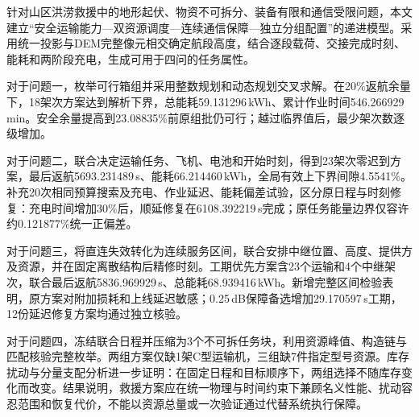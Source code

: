 针对山区洪涝救援中的地形起伏、物资不可拆分、装备有限和通信受限问题，本文建立“安全运输能力—双资源调度—连续通信保障—独立分组配置”的递进模型。采用统一投影与DEM完整像元相交确定航段高度，结合逐段载荷、交接完成时刻、能耗和两阶段充电，生成可用于四问的任务属性。

对于问题一，枚举可行箱组并采用整数规划和动态规划交叉求解。在20\%返航余量下，18架次方案达到解析下界，总能耗59.131296\,kWh、累计作业时间546.266929\,min。安全余量提高到23.08835\%前原组批仍可行；越过临界值后，最少架次数逐级增加。

对于问题二，联合决定运输任务、飞机、电池和开始时刻，得到23架次零迟到方案，最后返航5693.231489\,s、能耗66.214460\,kWh，全局有效上下界间隙4.5541\%。补充20次相同预算搜索及充电、作业延迟、能耗偏差试验，区分原日程与时刻修复：充电时间增加30\%后，顺延修复在6108.392219\,s完成；原任务能量边界仅容许约0.121877\%统一正偏差。

对于问题三，将直连失效转化为连续服务区间，联合安排中继位置、高度、提供方及资源，并在固定离散结构后精修时刻。工期优先方案含23个运输和4个中继架次，联合最后返航5836.969929\,s、总能耗68.939416\,kWh。新增完整区间检验表明，原方案对附加损耗和上线延迟敏感；0.25\,dB保障备选增加29.170597\,s工期，12份延迟修复方案均通过独立核验。

对于问题四，冻结联合日程并压缩为3个不可拆任务块，利用资源峰值、构造链与匹配核验完整枚举。两组方案仅缺1架C型运输机，三组缺7件指定型号资源。库存扰动与分量支配分析进一步证明：在固定日程和目标顺序下，两组选择不随库存变化而改变。结果说明，救援方案应在统一物理与时间约束下兼顾名义性能、扰动容忍范围和恢复代价，不能以资源总量或一次验证通过代替系统执行保障。
